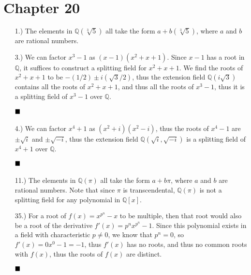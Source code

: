 \documentclass[11pt]{article}
\newcommand{\done}{
    \ensuremath{\strut\hfill\blacksquare}
}
\newcommand{\parens}[1]{\left(#1\right)}             %
\newcommand{\Q}{\mathbb{Q}}
\begin{document}

\pagestyle{fancy}
\fancyhead{}

\normalsize

\section*{Chapter 20}

\begin{itemize}
    \item [1.)] The elements in \( \Q\parens{\sqrt[3]{5}}\) all take the form
    \( a + b\parens{\sqrt[3]{5}} \), where \( a \) and \( b \) are rational
    numbers.

    \item [3.)] We can factor \( x^3 - 1 \) as \( (x - 1)(x^2 + x + 1) \).
    Since \( x - 1 \) has a root in \( \Q \), it suffices to construct a
    splitting field for \( x^2 + x + 1 \). We find the roots of
    \( x^2 + x + 1 \) to be \( -(1/2) \pm i\parens{\sqrt3/2}\), thus the
    extension field \( \Q\parens{i\sqrt3} \) contains all the roots of
    \( x^2 + x + 1 \), and thus all the roots of \( x^3 - 1 \), thus it is a
    splitting field of \( x^3 - 1 \) over \( \Q \).
    \done

    \item [4.)] We can factor \( x^4 + 1 \) as \( (x^2 + i)(x^2 - i) \), thus
    the roots of \( x^4 - 1 \) are \( \pm \sqrt{i} \) and \( \pm \sqrt{-i} \),
    thus the extension field \( \Q\parens{\sqrt{i}, \sqrt{-i}}\) is a
    splitting field of \( x^4 + 1 \) over \( \Q \).
    \done

    \item [11.)] The elements in \( \Q\parens{\pi} \) all take the form
    \( a + b\pi \), where \( a \) and \( b \) are rational numbers. Note that
    since \( \pi \) is transcendental, \( \Q(\pi) \) is not a splitting field
    for any polynomial in \( \Q[x] \).

    \item [35.)] For a root of \( f(x) = x^{p^n} - x \) to be multiple, then
    that root would also be a root of the derivative
    \( f'(x) = p^nx^{p^n} - 1 \). Since this polynomial exists in a field with
    characteristic \( p \ne 0 \), we know that \( p^n = 0 \), so
    \( f'(x) = 0x^{0} - 1 = -1 \), thus \( f'(x) \) has no roots, and thus no
    common roots with \( f(x) \), thus the roots of \( f(x) \) are distinct.
    \done
\end{itemize}
\end{document}
